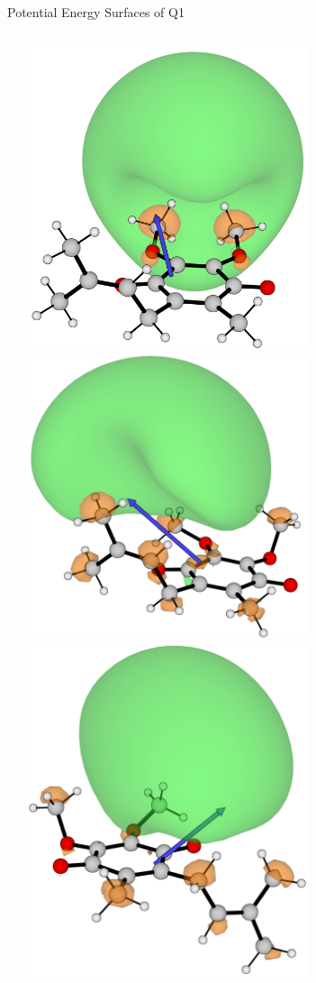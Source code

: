 \documentclass[9pt,t,xcolor=table]{beamer}
\begin{document}
\begin{frame}{\huge Potential Energy Surfaces of Q1}\large
	\begin{columns}
		\begin{column}[c]{0.7\textwidth}
			\footnotesize
			\vspace{-10pt}
			
		\end{column}
		\begin{column}[c]{0.3\textwidth}
			\centering
			\includegraphics[width=0.65\textwidth]{Figs/Q1_199.png}
			\includegraphics[width=0.65\textwidth]{Figs/Q1_249.png}
			\includegraphics[width=0.65\textwidth]{Figs/Q1_112.png}

\end{column}
\end{columns}
\end{frame}
\end{document}
